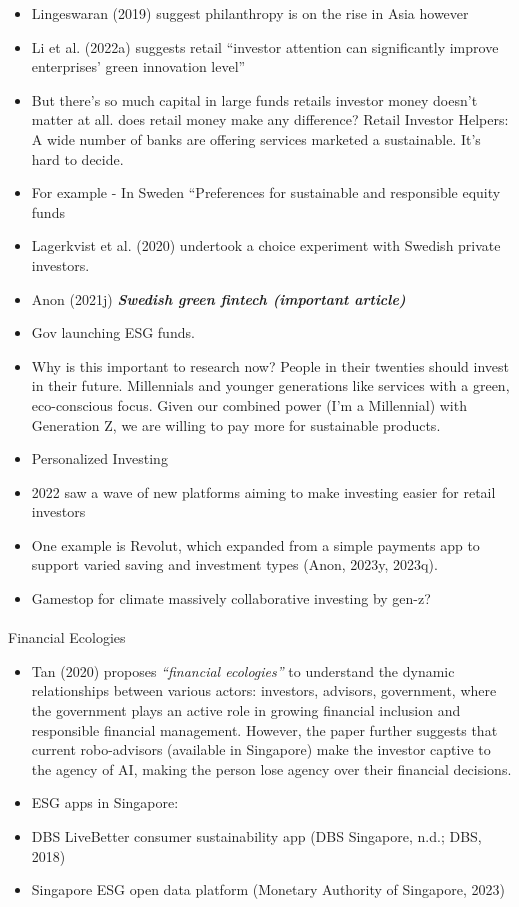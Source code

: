 \documentclass[
  letterpaper,
  DIV=11,
  numbers=noendperiod]{scrartcl}
\makeatletter
\let\oldparagraph\paragraph
\renewcommand{\paragraph}{
    \@ifstar
      \xxxParagraphStar
      \xxxParagraphNoStar
  }
\newcommand{\xxxParagraphStar}[1]{\oldparagraph*{#1}\mbox{}}
\newcommand{\xxxParagraphNoStar}[1]{\oldparagraph{#1}\mbox{}}
\makeatother
\begin{document}
\begin{itemize}
\item
  Lingeswaran (2019) suggest philanthropy is on the rise in Asia however
\item
  Li et al. (2022a) suggests retail ``investor attention can
  significantly improve enterprises' green innovation level''
\item
  But there's so much capital in large funds retails investor money
  doesn't matter at all. does retail money make any difference? Retail
  Investor Helpers: A wide number of banks are offering services
  marketed a sustainable. It's hard to decide.
\item
  For example - In Sweden ``Preferences for sustainable and responsible
  equity funds
\item
  Lagerkvist et al. (2020) undertook a choice experiment with Swedish
  private investors.
\item
  Anon (2021j) \textbf{\emph{Swedish green fintech (important article)}}
\item
  Gov launching ESG funds.
\item
  Why is this important to research now? People in their twenties should
  invest in their future. Millennials and younger generations like
  services with a green, eco-conscious focus. Given our combined power
  (I'm a Millennial) with Generation Z, we are willing to pay more for
  sustainable products.
\item
  Personalized Investing
\item
  2022 saw a wave of new platforms aiming to make investing easier for
  retail investors
\item
  One example is Revolut, which expanded from a simple payments app to
  support varied saving and investment types (Anon, 2023y, 2023q).
\item
  Gamestop for climate massively collaborative investing by gen-z?
\end{itemize}

\paragraph{Financial Ecologies}\label{financial-ecologies}

\begin{itemize}
\item
  Tan (2020) proposes \emph{``financial ecologies''} to understand the
  dynamic relationships between various actors: investors, advisors,
  government, where the government plays an active role in growing
  financial inclusion and responsible financial management. However, the
  paper further suggests that current robo-advisors (available in
  Singapore) make the investor captive to the agency of AI, making the
  person lose agency over their financial decisions.
\item
  ESG apps in Singapore:
\item
  DBS LiveBetter consumer sustainability app (DBS Singapore, n.d.; DBS,
  2018)
\item
  Singapore ESG open data platform (Monetary Authority of Singapore,
  2023)
\end{itemize}
\end{document}
